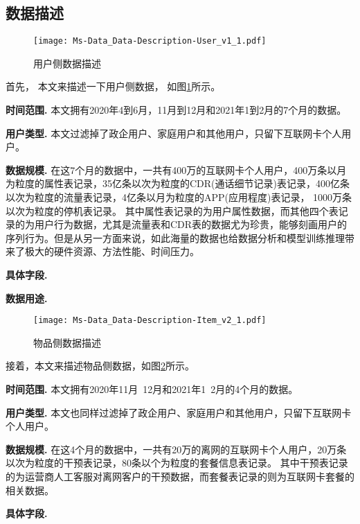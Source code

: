 \subsection{数据描述}
\begin{figure}[hbt]
	\centering
	\texttt{[image: Ms-Data\_Data-Description-User\_v1\_1.pdf]}
	\caption{用户侧数据描述}
	\label{Fig:User-Side-Data}
\end{figure}
首先， 本文来描述一下用户侧数据， 如图\ref{Fig:User-Side-Data}所示。\par
\textbf{时间范围.} 本文拥有2020年4到6月，11月到12月和2021年1到2月的7个月的数据。\par
\textbf{用户类型.} 本文过滤掉了政企用户、家庭用户和其他用户，只留下互联网卡个人用户。\par
\textbf{数据规模.} 在这7个月的数据中，一共有400万的互联网卡个人用户，400万条以月为粒度的属性表记录，35亿条以次为粒度的CDR(通话细节记录)表记录，400亿条以次为粒度的流量表记录，4亿条以月为粒度的APP(应用程度)表记录， 1000万条以次为粒度的停机表记录。
其中属性表记录的为用户属性数据，而其他四个表记录的为用户行为数据，尤其是流量表和CDR表的数据尤为珍贵，能够刻画用户的序列行为。但是从另一方面来说，如此海量的数据也给数据分析和模型训练推理带来了极大的硬件资源、方法性能、时间压力。\par
\textbf{具体字段.}\par
\textbf{数据用途.} \par

\begin{figure}[hbt]
	\centering
	\texttt{[image: Ms-Data\_Data-Description-Item\_v2\_1.pdf]}
	\caption{物品侧数据描述}
	\label{Fig:Item-Side-Data}
\end{figure}
接着，本文来描述物品侧数据，如图\ref{Fig:Item-Side-Data}所示。\par
\textbf{时间范围.} 本文拥有2020年11月~12月和2021年1~2月的4个月的数据。\par
\textbf{用户类型.} 本文也同样过滤掉了政企用户、家庭用户和其他用户，只留下互联网卡个人用户。\par
\textbf{数据规模.} 在这4个月的数据中，一共有20万的离网的互联网卡个人用户，20万条以次为粒度的干预表记录，80条以个为粒度的套餐信息表记录。
其中干预表记录的为运营商人工客服对离网客户的干预数据，而套餐表记录的则为互联网卡套餐的相关数据。\par
\textbf{具体字段.}\par



